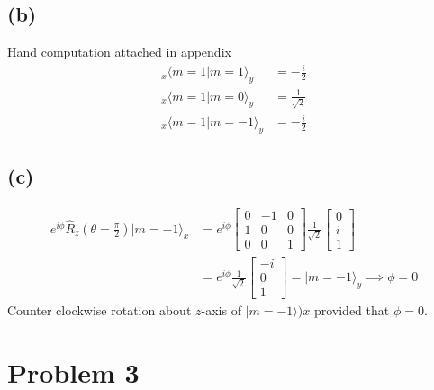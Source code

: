\documentclass[letter]{article}
\begin{document}
\subsection*{(b)} 
Hand computation attached in appendix
\begin{align*}
	_x \langle m = 1 | m = 1 \rangle _ y &= - \frac{i}{2} \\ 
	_x \langle m = 1 | m = 0 \rangle _ y &= \frac{1}{\sqrt{2} } \\ 
	_x \langle m = 1 | m = -1 \rangle _ y &= - \frac{i}{2}
\end{align*}


\subsection*{(c)} 
\begin{align*}
	e^{i \phi} \hat{R}_z (\theta = \frac{\pi}{2}) | m = -1 \rangle _x &= 
	e^{i \phi} 
	\begin{bmatrix} 0 & -1 & 0 \\ 
	1 & 0 & 0 \\ 
	0 & 0 & 1 
\end{bmatrix} 
\frac{1}{\sqrt{2} } 
\begin{bmatrix} 0 \\ i \\ 1  \end{bmatrix}  \\ 
			  &= 
	e^{i \phi }		  \frac{1}{\sqrt{2} } 
			  \begin{bmatrix} -i \\ 0 \\ 1 \end{bmatrix}  = | m = -1 \rangle _y  \implies \phi = 0 
\end{align*}
Counter clockwise rotation about $z$-axis of $| m = -1 \rangle )x$ provided that $\phi = 0$. 


\section*{Problem 3} 
\end{document}
